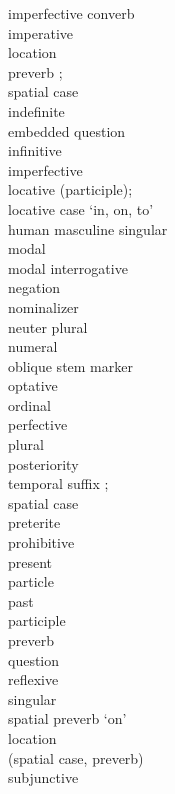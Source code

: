 \begin{multicols}{2}
\begin{tabbing}
				\>	imperfective converb\\
				\>	imperative\\
				\>	location \\
			{}		\>	    preverb ;\\
			{}		\>	    spatial case  \\
				\>	indefinite\\
				\>	embedded question\\
				\>	infinitive\\
				\>	imperfective\\
				\>	locative (participle);\\
			{}		\>	locative case `in, on, to'\\
					\>	human masculine singular\\
				\>	modal\\
				\>	modal interrogative\\
				\>	negation\\
				\>	nominalizer\\
				\>	neuter plural\\
				\>	numeral\\
				\>	oblique stem marker\\
				\>	optative\\
				\>	ordinal\\
				\>	perfective\\
				\>	plural\\
				\>	posteriority \\
			{}		\>	    temporal suffix ;\\
			{}		\>	    spatial case  \\
				\>	preterite\\
				\>	prohibitive\\
				\>	present\\
				\>	particle\\
				\>	past\\
				\>	participle\\
				\>	preverb\\
					\>	question\\
				\>	reflexive\\
				\>	singular\\
				\>	spatial preverb `on'\\
				\>	location \\
			{}		\>	(spatial case, preverb)\\
				\>	subjunctive
		\end{tabbing}
	\end{multicols}



